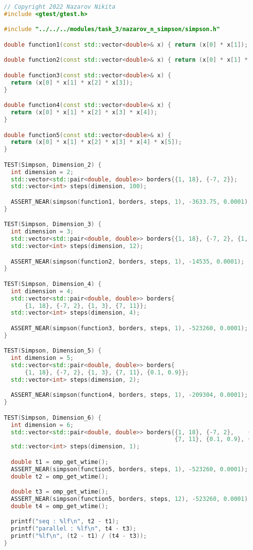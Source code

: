 \documentclass{report}
\begin{document}
\begin{lstlisting}[language=C++]
// Copyright 2022 Nazarov Nikita
#include <gtest/gtest.h>

#include "../../../modules/task_3/nazarov_n_simpson/simpson.h"

double function1(const std::vector<double>& x) { return (x[0] * x[1]); }

double function2(const std::vector<double>& x) { return (x[0] * x[1] * x[2]); }

double function3(const std::vector<double>& x) {
  return (x[0] * x[1] * x[2] * x[3]);
}

double function4(const std::vector<double>& x) {
  return (x[0] * x[1] * x[2] * x[3] * x[4]);
}

double function5(const std::vector<double>& x) {
  return (x[0] * x[1] * x[2] * x[3] * x[4] * x[5]);
}

TEST(Simpson, Dimension_2) {
  int dimension = 2;
  std::vector<std::pair<double, double>> borders{{1, 18}, {-7, 2}};
  std::vector<int> steps(dimension, 100);

  ASSERT_NEAR(simpson(function1, borders, steps, 1), -3633.75, 0.0001);
}

TEST(Simpson, Dimension_3) {
  int dimension = 3;
  std::vector<std::pair<double, double>> borders{{1, 18}, {-7, 2}, {1, 3}};
  std::vector<int> steps(dimension, 12);

  ASSERT_NEAR(simpson(function2, borders, steps, 1), -14535, 0.0001);
}

TEST(Simpson, Dimension_4) {
  int dimension = 4;
  std::vector<std::pair<double, double>> borders{
      {1, 18}, {-7, 2}, {1, 3}, {7, 11}};
  std::vector<int> steps(dimension, 4);

  ASSERT_NEAR(simpson(function3, borders, steps, 1), -523260, 0.0001);
}

TEST(Simpson, Dimension_5) {
  int dimension = 5;
  std::vector<std::pair<double, double>> borders{
      {1, 18}, {-7, 2}, {1, 3}, {7, 11}, {0.1, 0.9}};
  std::vector<int> steps(dimension, 2);

  ASSERT_NEAR(simpson(function4, borders, steps, 1), -209304, 0.0001);
}

TEST(Simpson, Dimension_6) {
  int dimension = 6;
  std::vector<std::pair<double, double>> borders{{1, 18}, {-7, 2},    {1, 3},
                                                 {7, 11}, {0.1, 0.9}, {2, 3}};
  std::vector<int> steps(dimension, 1);

  double t1 = omp_get_wtime();
  ASSERT_NEAR(simpson(function5, borders, steps, 1), -523260, 0.0001);
  double t2 = omp_get_wtime();

  double t3 = omp_get_wtime();
  ASSERT_NEAR(simpson(function5, borders, steps, 12), -523260, 0.0001);
  double t4 = omp_get_wtime();

  printf("seq : %lf\n", t2 - t1);
  printf("parallel : %lf\n", t4 - t3);
  printf("%lf\n", (t2 - t1) / (t4 - t3));
}
\end{lstlisting}
\end{document}
